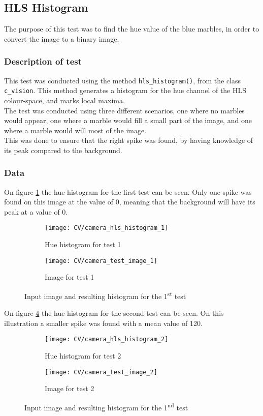 \documentclass[../Head/Main.tex]{subfiles}
\begin{document}
\subsection{HLS Histogram}
\label{subsec:test_HLS_hist}
The purpose of this test was to find the hue value of the blue marbles, in order to convert the image to a binary image. 

\subsubsection{Description of test}
This test was conducted using the method \texttt{hls\_histogram()}, from the class \texttt{c\_vision}. This method generates a histogram for the hue channel of the HLS colour-space, and marks local maxima.\\
The test was conducted using three different scenarios, one where no marbles would appear, one where a marble would fill a small part of the image, and one where a marble would will most of the image.\\
This was done to ensure that the right spike was found, by having knowledge of its peak compared to the background.  
\subsubsection{Data}
On figure \ref{fig:hist_test_1} the hue histogram for the first test can be seen. Only one spike was found on this image at the value of 0, meaning that the background will have its peak at a value of 0. 
\begin{figure}[H]
	\centering
	\begin{subfigure}[b]{0.48\textwidth}
		\centering
		\texttt{[image: CV/camera\_hls\_histogram\_1]}
		\caption{Hue histogram for test 1}
		\label{fig:hist_test_1}
	\end{subfigure}
	\hfill
	\begin{subfigure}[b]{0.5\textwidth}
		\centering
		\texttt{[image: CV/camera\_test\_image\_1]}
		\caption{Image for test 1}
		\label{fig:image_test_1}
	\end{subfigure}
	\caption{Input image and resulting histogram for the 1\textsuperscript{st} test}
	\label{fig:test_1}
\end{figure}

On figure \ref{fig:hist_test_2} the hue histogram for the second test can be seen. On this illustration a smaller spike was found with a mean value of 120.
\begin{figure}[H]
	\centering
	\begin{subfigure}[b]{0.48\textwidth}
		\centering
		\texttt{[image: CV/camera\_hls\_histogram\_2]}
		\caption{Hue histogram for test 2}
		\label{fig:hist_test_2}
	\end{subfigure}
	\hfill
	\begin{subfigure}[b]{0.5\textwidth}
		\centering
		\texttt{[image: CV/camera\_test\_image\_2]}
		\caption{Image for test 2}
		\label{fig:image_test_2}
	\end{subfigure}
	\caption{Input image and resulting histogram for the 1\textsuperscript{nd} test}
	\label{fig:test_2}
\end{figure}
\end{document}
